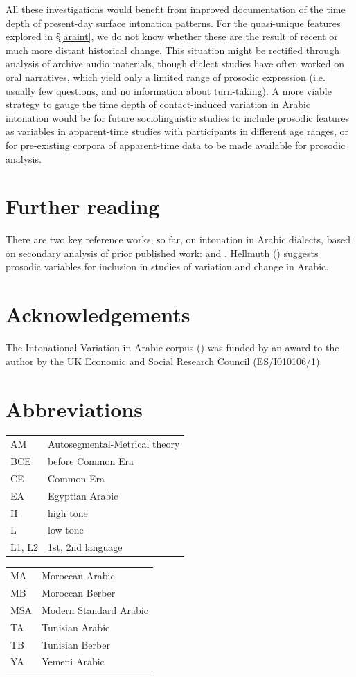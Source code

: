 \documentclass[output=paper]{langsci/langscibook}
\begin{document}
All these investigations would benefit from improved documentation of the time depth of present-day surface intonation patterns. For the quasi-unique features explored in §\ref{araint}, we do not know whether these are the result of recent or much more distant historical change. This situation might be rectified through analysis of archive audio materials, though dialect studies have often worked on oral narratives, which yield only a limited range of prosodic expression (i.e. usually few questions, and no information about turn-taking). A more viable strategy to gauge the time depth of contact-induced variation in Arabic intonation would be for future sociolinguistic studies to include prosodic features as variables in apparent-time studies with participants in different age ranges, or for pre-existing corpora of apparent-time data to be made available for prosodic analysis.

\section*{Further reading}

There are two key reference works, so far, on intonation in Arabic dialects, based on secondary analysis of prior published work: \citet{Chahal2011} and \citet{ElZarka2017}. Hellmuth (\citeyear{Hellmuth2019}) suggests prosodic variables for inclusion in studies of variation and change in Arabic. 

\section*{Acknowledgements}

The Intonational Variation in Arabic corpus (\citeyear{HellmuthAlmbark2017}) was funded by an award to the author by the UK Economic and Social Research Council (ES/I010106/1).

\section*{Abbreviations}

\begin{tabularx}{.5\textwidth}{@{}lQ@{}}
AM & Autosegmental-Metrical theory \\
BCE & before Common Era \\
CE & Common Era \\
EA & Egyptian Arabic \\
H & high tone \\
L & low tone \\
L1, L2 & 1st, 2nd language \\
\end{tabularx}%
\begin{tabularx}{.5\textwidth}{@{}lQ@{}}
MA & Moroccan Arabic \\
MB & Moroccan Berber \\
MSA & Modern Standard Arabic \\
TA & Tunisian Arabic \\
TB & Tunisian Berber \\
YA & Yemeni Arabic \\
\end{tabularx}%


\sloppy
\printbibliography[heading=subbibliography,notkeyword=this]
\end{document}
